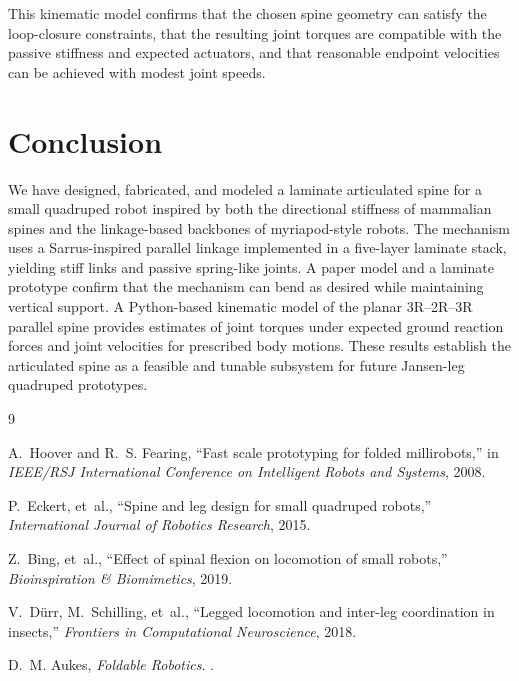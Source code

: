 \documentclass[11pt,letterpaper]{article}
\begin{document}
This kinematic model confirms that the chosen spine geometry can satisfy the
loop-closure constraints, that the resulting joint torques are compatible with
the passive stiffness and expected actuators, and that reasonable endpoint
velocities can be achieved with modest joint speeds.


\section{Conclusion}
\label{sec:conclusion}

We have designed, fabricated, and modeled a laminate articulated spine for a
small quadruped robot inspired by both the directional stiffness of mammalian
spines and the linkage-based backbones of myriapod-style robots. The mechanism
uses a Sarrus-inspired parallel linkage implemented in a five-layer laminate
stack, yielding stiff links and passive spring-like joints. A paper model and a
laminate prototype confirm that the mechanism can bend as desired while
maintaining vertical support. A Python-based kinematic model of the planar 3R–2R–3R parallel spine provides estimates of joint torques under expected
ground reaction forces and joint velocities for prescribed body motions. These
results establish the articulated spine as a feasible and tunable subsystem
for future Jansen-leg quadruped prototypes.


\begin{thebibliography}{9}

A.~Hoover and R.~S. Fearing,
\newblock ``Fast scale prototyping for folded millirobots,''
\newblock in \emph{IEEE/RSJ International Conference on Intelligent Robots and Systems}, 2008.

P.~Eckert, et~al.,
\newblock ``Spine and leg design for small quadruped robots,''
\newblock \emph{International Journal of Robotics Research}, 2015.

Z.~Bing, et~al.,
\newblock ``Effect of spinal flexion on locomotion of small robots,''
\newblock \emph{Bioinspiration \& Biomimetics}, 2019.

V.~D\"urr, M.~Schilling, et~al.,
\newblock ``Legged locomotion and inter-leg coordination in insects,''
\newblock \emph{Frontiers in Computational Neuroscience}, 2018.

D.~M. Aukes,
\newblock \emph{Foldable Robotics}.
.

\end{thebibliography}
\end{document}
